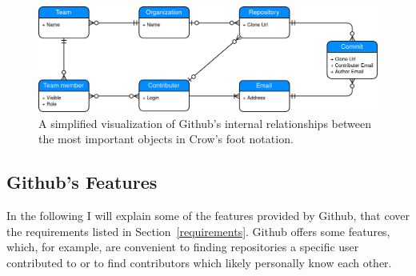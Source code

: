 \begin{figure}[H]
\includegraphics[scale=0.27]{./graphs/github-data-structure}
\centering
\caption{A simplified visualization of Github's internal relationships between the most important objects in Crow's foot notation.}\label{fig:github-relationship}
\end{figure}

\subsection{Github's Features}\label{github-features}
In the following I will explain some of the features provided by Github, that cover the requirements listed in Section~\ref{requirements}.
Github offers some features, which, for example, are convenient to finding repositories a specific user contributed to or to find contributors which likely personally know each other.

